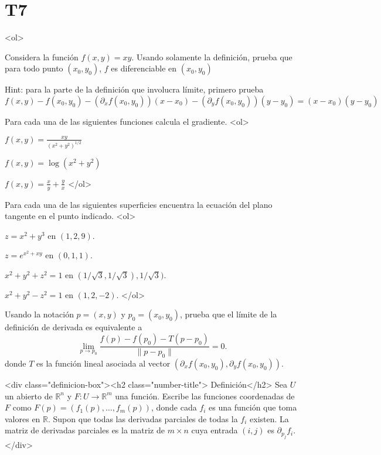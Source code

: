 \documentclass{article}
\theoremstyle{definition}
\begin{document}
\section*{T7}

<ol>
\item Considera la función $f(x,y)=xy$. Usando solamente la definición, prueba
  que para todo punto  $(x_0,y_0)$, $f$ es diferenciable en $(x_0,y_0)$



  Hint: para la parte de la definición que involucra  límite,
  primero prueba
        $$
        f(x,y)-f(x_0,y_0)- (\partial_xf(x_0,y_0))(x-x_0)-(\partial_yf(x_0,y_0))
        (y-y_0)= (x-x_0)(y-y_0)
        $$



      \item Para cada una de las siguientes funciones calcula el gradiente.
        <ol>
        \item $f(x,y)=\frac{xy}{(x^2+y^2)^{1/2}}$
        \item $f(x,y)=\log(x^2+y^2)$
          \item $f(x,y)=\frac{x}{y}+\frac{y}{x}$
        </ol>


        
      \item Para cada una de las siguientes superficies encuentra la
        ecuación del plano tangente en el punto indicado.
        <ol>
        \item $z=x^2+y^3$ en $(1,2,9)$.
        \item $z=e^{x^2+xy}$ en $(0,1,1)$.
        \item $x^2+y^2+z^2=1$ en $(1/\sqrt{3}, 1/\sqrt{3}), 1/\sqrt{3})$.
          \item $x^2+y^2-z^2=1$ en $(1,2,-2)$.
        </ol>


                
      \item Usando la notación  $p=(x,y)$ y  $p_0=(x_0,y_0)$, prueba que el
        límite de la definición de derivada  es equivalente a
        $$
        \lim_{p\to p_0}\frac{f(p)-f(p_0)-T(p-p_0) }{\|p-p_0\|}=0.
        $$
        donde $T$ es la función lineal asociada al vector
        $(\partial_xf(x_0,y_0), \partial_yf(x_0,y_0))$.


        

                <div class="definicion-box"><h2 class="number-title">  Definición</h2>
          Sea $U$ un abierto de $\mathbb{R}^n$ y $F:U \to \mathbb{R}^m$ una función.
          Escribe las funciones coordenadas de $F$ como $F(p)=(f_1(p), \dots, f_m(p))$,
          donde cada $f_i$ es una función que toma valores en $\mathbb{R}$. Supon que
          todas las derivadas parciales de todas la $f_i$ existen. La matriz de derivadas
          parciales es la matriz de $m\times n$ cuya entrada $(i,j)$ es $\partial_{p_j}f_i$.
        </div>
\end{document}
